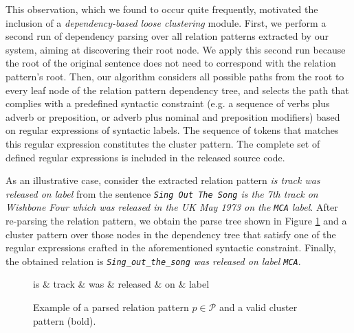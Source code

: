 This observation, which we found to occur quite frequently, motivated the inclusion of a \textit{dependency-based loose clustering} module. First, we perform a second run of dependency parsing over all relation patterns extracted by our system, aiming at discovering their root node. We apply this second run because the root of the original sentence does not need to correspond with the relation pattern's root. Then, our algorithm considers all possible paths from the root to every leaf node of the relation pattern dependency tree, and selects the path that complies with a predefined syntactic constraint (e.g. a sequence of verbs plus adverb or preposition, or adverb plus nominal and preposition modifiers) based on regular expressions of syntactic labels. The sequence of tokens that matches this regular expression constitutes the cluster pattern. The complete set of defined regular expressions is included in the released source code.

As an illustrative case, consider the extracted relation pattern \textit{is track was released on label} from the sentence \textit{\texttt{Sing Out The Song} is the 7th track on Wishbone Four which was released in the UK May 1973 on the \texttt{MCA} label}. After re-parsing the relation pattern, we obtain the parse tree shown in Figure \ref{fig:parsedpattern} and a cluster pattern over those nodes in the dependency tree that satisfy one of the regular expressions crafted in the aforementioned syntactic constraint. Finally, the obtained relation is \textit{\texttt{Sing\_out\_the\_song} was released on label \texttt{MCA}}.

\begin{figure}[!htb]
\centering
\begin{dependency}
\begin{deptext}[column sep=.5cm]
is \& track \& was \& released \& on \& label \\
\end{deptext}




\end{dependency}
\vspace*{-5mm}
\caption{Example of a parsed relation pattern $p \in \mathcal{P}$ and a valid cluster pattern (bold).}
\label{fig:parsedpattern}
\end{figure}


